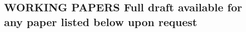 \documentclass{article}
\begin{document}










\subsection*{\textbf{WORKING PAPERS Full draft available for any paper listed below upon request}}
\end{document}
